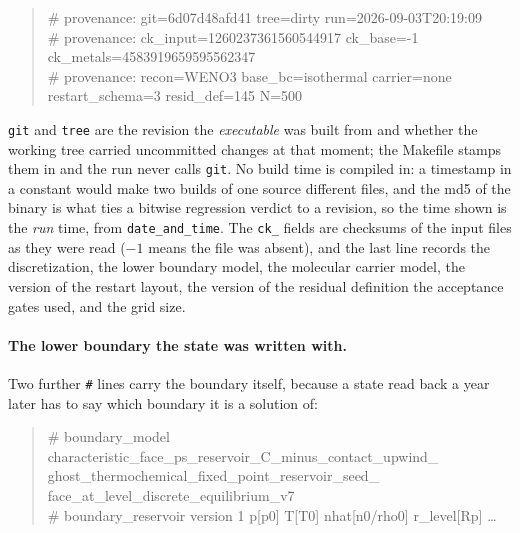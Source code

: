 \documentclass[english,a4paper]{my_memo}
\begin{document}
\begin{quote}\ttfamily\small
\# provenance: git=6d07d48afd41 tree=dirty run=2026-09-03T20:19:09\\
\# provenance: ck\_input=1260237361560544917 ck\_base=-1
ck\_metals=4583919659595562347\\
\# provenance: recon=WENO3 base\_bc=isothermal carrier=none
restart\_schema=3 resid\_def=145 N=500
\end{quote}

\noindent\texttt{git} and \texttt{tree} are the revision the \emph{executable}
was built from and whether the working tree carried uncommitted changes at that
moment; the Makefile stamps them in and the run never calls \texttt{git}. No
build time is compiled in: a timestamp in a constant would make two builds of
one source different files, and the md5 of the binary is what ties a bitwise
regression verdict to a revision, so the time shown is the \emph{run} time,
from \texttt{date\_and\_time}. The \texttt{ck\_} fields are checksums of the
input files as they were read ($-1$ means the file was absent), and the last line
records the discretization, the lower boundary model, the molecular carrier
model, the version of the restart layout, the version of the residual definition
the acceptance gates used, and the grid size.

\paragraph{The lower boundary the state was written with.} Two further
\texttt{\#} lines carry the boundary itself, because a state read back a year
later has to say which boundary it is a solution of:

\begin{quote}\ttfamily\small
\# boundary\_model characteristic\_face\_ps\_reservoir\_C\_minus\_contact\_upwind\_\\\hspace*{2em}ghost\_thermochemical\_fixed\_point\_reservoir\_seed\_\\\hspace*{2em}face\_at\_level\_discrete\_equilibrium\_v7\\
\# boundary\_reservoir version 1 p[p0] T[T0] nhat[n0/rho0] r\_level[Rp] \ldots
\end{quote}
\end{document}

